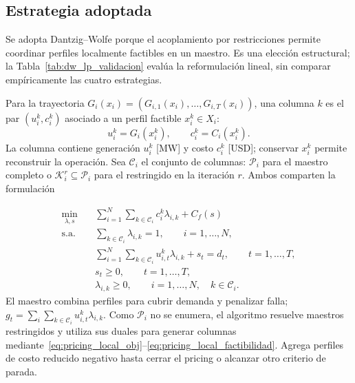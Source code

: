 \subsection*{Estrategia adoptada}
\label{par:estrategia_descomposicion}

Se adopta Dantzig--Wolfe porque el acoplamiento por restricciones permite coordinar perfiles localmente factibles en un maestro. Es una elección estructural; la Tabla~\ref{tab:dw_lp_validacion} evalúa la reformulación lineal, sin comparar empíricamente las cuatro estrategias.

Para la trayectoria $G_i(x_i)=(G_{i,1}(x_i),\ldots,G_{i,T}(x_i))$, una columna $k$ es el par $(u_i^k,c_i^k)$ asociado a un perfil factible $x_i^k\in X_i$:
\begin{equation}
    u_i^k = G_i(x_i^k),
    \qquad
    c_i^k = C_i(x_i^k).
    \label{eq:columna_dw_definicion_general}
\end{equation}
La columna contiene generación $u_i^k$ [MW] y costo $c_i^k$ [USD]; conservar $x_i^k$ permite reconstruir la operación. Sea $\mathcal C_i$ el conjunto de columnas: $\mathcal P_i$ para el maestro completo o $\mathcal K_i^r\subseteq\mathcal P_i$ para el restringido en la iteración $r$. Ambos comparten la formulación

\begin{align}
    \min_{\lambda,s}
    \quad
    &
    \sum_{i=1}^{N}
    \sum_{k\in\mathcal C_i}
    c_i^k \lambda_{i,k}
    +
    C_f(s)
    \label{eq:maestro_dw_obj}
    \\
    \text{s.a.}
    \quad
    &
    \sum_{k\in\mathcal C_i}\lambda_{i,k}=1,
    \qquad i=1,\ldots,N,
    \label{eq:maestro_dw_convexidad}
    \\
    &
    \sum_{i=1}^{N}
    \sum_{k\in\mathcal C_i}
    u_{i,t}^{k}\lambda_{i,k}
    +
    s_t
    =
    d_t,
    \qquad t=1,\ldots,T,
    \label{eq:maestro_dw_demanda}
    \\
    &
    s_t\geq 0,
    \qquad t=1,\ldots,T,
    \label{eq:maestro_dw_falla}
    \\
    &
    \lambda_{i,k}\geq 0,
    \qquad i=1,\ldots,N,\quad k\in\mathcal C_i.
    \label{eq:maestro_dw_lambda}
\end{align}
El maestro combina perfiles para cubrir demanda y penalizar falla; $g_t=\sum_i\sum_{k\in\mathcal C_i}u_{i,t}^k\lambda_{i,k}$. Como $\mathcal P_i$ no se enumera, el algoritmo resuelve maestros restringidos y utiliza sus duales para generar columnas mediante~\eqref{eq:pricing_local_obj}--\eqref{eq:pricing_local_factibilidad}. Agrega perfiles de costo reducido negativo hasta cerrar el pricing o alcanzar otro criterio de parada.


